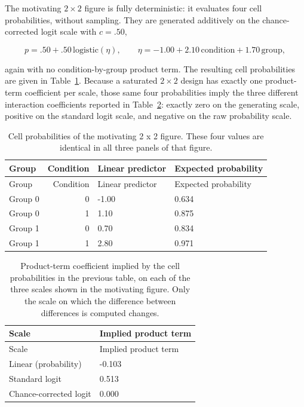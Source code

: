 \documentclass[
  man,
  floatsintext,
  longtable,
  nolmodern,
  notxfonts,
  notimes,
  colorlinks=true,linkcolor=blue,citecolor=blue,urlcolor=blue]{apa7}
\begin{document}
The motivating \(2 \times 2\) figure is fully deterministic: it
evaluates four cell probabilities, without sampling. They are generated
additively on the chance-corrected logit scale with \(c = .50\),

\[
p = .50 + .50\,\mathrm{logistic}(\eta), \qquad
\eta = -1.00 + 2.10\,\text{condition} + 1.70\,\text{group},
\]

again with no condition-by-group product term. The resulting cell
probabilities are given in Table~\ref{tbl-motivating-example-cells}.
Because a saturated \(2 \times 2\) design has exactly one product-term
coefficient per scale, those same four probabilities imply the three
different interaction coefficients reported in
Table~\ref{tbl-motivating-example}: exactly zero on the generating
scale, positive on the standard logit scale, and negative on the raw
probability scale.

\begin{longtable}[]{@{}lrll@{}}
\caption{Cell probabilities of the motivating 2 x 2 figure. These four
values are identical in all three panels of that
figure.}\label{tbl-motivating-example-cells}\tabularnewline
\toprule\noalign{}
Group & Condition & Linear predictor & Expected probability \\
\midrule\noalign{}
\endfirsthead
\toprule\noalign{}
Group & Condition & Linear predictor & Expected probability \\
\midrule\noalign{}
\endhead
\bottomrule\noalign{}
\endlastfoot
Group 0 & 0 & -1.00 & 0.634 \\
Group 0 & 1 & 1.10 & 0.875 \\
Group 1 & 0 & 0.70 & 0.834 \\
Group 1 & 1 & 2.80 & 0.971 \\
\end{longtable}

\begin{longtable}[]{@{}ll@{}}
\caption{Product-term coefficient implied by the cell probabilities in
the previous table, on each of the three scales shown in the motivating
figure. Only the scale on which the difference between differences is
computed changes.}\label{tbl-motivating-example}\tabularnewline
\toprule\noalign{}
Scale & Implied product term \\
\midrule\noalign{}
\endfirsthead
\toprule\noalign{}
Scale & Implied product term \\
\midrule\noalign{}
\endhead
\bottomrule\noalign{}
\endlastfoot
Linear (probability) & -0.103 \\
Standard logit & 0.513 \\
Chance-corrected logit & 0.000 \\
\end{longtable}
\end{document}
